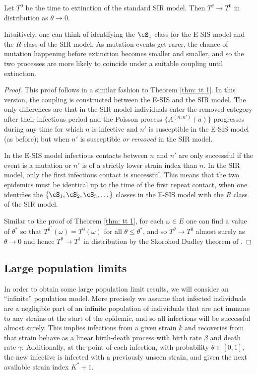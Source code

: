 \documentclass[smallextended]{svjour3}       %
\begin{document}
\begin{mythm}\label{thm: tt 0}
	Let $T^0$ be the time to extinction of the standard SIR model. Then $T^{\theta} \rightarrow T^0$ in distribution as $\theta \rightarrow 0$.
\end{mythm}
Intuitively, one can think of identifying the $\cS_1$-class for the E-SIS model 
and the $R$-class of the SIR model. As mutation events get rarer, the chance of mutation happening before extinction becomes smaller and smaller, and so the two processes are more likely to coincide under a suitable coupling until extinction.
\begin{proof}
This proof follows in a similar fashion to Theorem \ref{thm: tt 1}. In this version, the coupling is constructed between the E-SIS and the SIR model. The only differences are that in the SIR model individuals enter the removed category after their infectious period and the Poisson process $\{A^{(n,n')}(u)\}$ progresses during any time for which $n$ is infective and $n'$ is susceptible in the E-SIS model (as before); but when $n'$ is susceptible \emph{or removed} in the SIR model. 

In the E-SIS model infectious contacts between $n$ and $n'$ are only successful if the event is a mutation or $n'$ is of a strictly lower strain index than $n$. In the SIR model, only the first infectious contact is successful. This means that the two epidemics must be identical up to the time of the first repeat contact, when one identifies the $\{\cS_1, \cS_2, \cS_3, \dots\}$ classes in the E-SIS model with the $R$ class of the SIR model.

Similar to the proof of Theorem \ref{thm: tt 1}, for each $\omega\in E$ one can find a value of $\theta^*$ so that $T^{\theta^*}(\omega) = T^0(\omega)$ for all $\theta \leq \theta^*$, and so $T^{\theta} \rightarrow T^0$ almost surely as $\theta\rightarrow 0$ and hence $T^\theta\rightarrow T^1$ in distribution by the Skorohod Dudley theorem of \cite{dudley1968}.
\end{proof}

\subsection{Large population limits}\label{subsec: bdps}
In order to obtain some large population limit results, we will consider an ``infinite'' population model. More precisely we assume that infected individuals are a negligible part of an infinite population of individuals that are not immune to any strains at the start of the epidemic, and so all infections will be successful almost surely.  This implies infections from a given strain $k$ and recoveries from that strain behave as a linear birth-death process with birth rate $\beta$ and death rate $\gamma$. Additionally, at the point of each infection, with probability $\theta \in [0,1]$, the new infective is infected with a previously unseen strain, and given the next available strain index $K^* + 1$.
\end{document}
